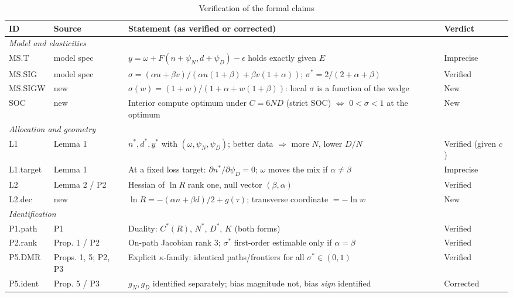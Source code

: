 \begin{table}[htbp]
\centering
\footnotesize
\begin{threeparttable}
\caption{Verification of the formal claims}
\label{tab:m7_claims}
\begin{tabular}{@{}l p{} p{} p{}@{}}
\toprule
ID & Source & Statement (as verified or corrected) & Verdict \\
\midrule
\multicolumn{4}{l}{\textit{Model and elasticities}} \\
MS.T & \raggedright model spec & \raggedright $y=\omega+F(n+\psi_N,d+\psi_D)-\epsilon$ holds exactly given $E$ & \raggedright Imprecise \tabularnewline
MS.SIG & \raggedright model spec & \raggedright $\sigma=(\alpha u+\beta v)/(\alpha u(1+\beta)+\beta v(1+\alpha))$; $\sigma^*=2/(2+\alpha+\beta)$ & \raggedright Verified \tabularnewline
MS.SIGW & \raggedright new & \raggedright $\sigma(w)=(1+w)/(1+\alpha+w(1+\beta))$: local $\sigma$ is a function of the wedge & \raggedright New \tabularnewline
SOC & \raggedright new & \raggedright Interior compute optimum under $C=6ND$ (strict SOC) $\Leftrightarrow$ $0<\sigma<1$ at the optimum & \raggedright New \tabularnewline
\multicolumn{4}{l}{\textit{Allocation and geometry}} \\
L1 & \raggedright Lemma 1 & \raggedright $n^*,d^*,y^*$ with $(\omega,\psi_N,\psi_D)$; better data $\Rightarrow$ more $N$, lower $D/N$ & \raggedright Verified (given $c$) \tabularnewline
L1.target & \raggedright Lemma 1 & \raggedright At a fixed loss target: $\partial n^*/\partial\psi_D=0$; $\omega$ moves the mix if $\alpha\neq\beta$ & \raggedright Imprecise \tabularnewline
L2 & \raggedright Lemma 2 / P2 & \raggedright Hessian of $\ln R$ rank one, null vector $(\beta,\alpha)$ & \raggedright Verified \tabularnewline
L2.dec & \raggedright new & \raggedright $\ln R=-(\alpha n+\beta d)/2+g(\tau)$; transverse coordinate $=-\ln w$ & \raggedright New \tabularnewline
\multicolumn{4}{l}{\textit{Identification}} \\
P1.path & \raggedright P1 & \raggedright Duality: $C^*(R)$, $N^*$, $D^*$, $K$ (both forms) & \raggedright Verified \tabularnewline
P2.rank & \raggedright Prop. 1 / P2 & \raggedright On-path Jacobian rank 3; $\sigma^*$ first-order estimable only if $\alpha=\beta$ & \raggedright Verified \tabularnewline
P5.DMR & \raggedright Props. 1, 5; P2, P3 & \raggedright Explicit $\kappa$-family: identical paths/frontiers for all $\sigma^*\in(0,1)$ & \raggedright Verified \tabularnewline
P5.ident & \raggedright Prop. 5 / P3 & \raggedright $g_N,g_D$ identified separately; bias magnitude not, bias \emph{sign} identified & \raggedright Corrected \tabularnewline

\end{tabular}
\end{threeparttable}
\end{table}
